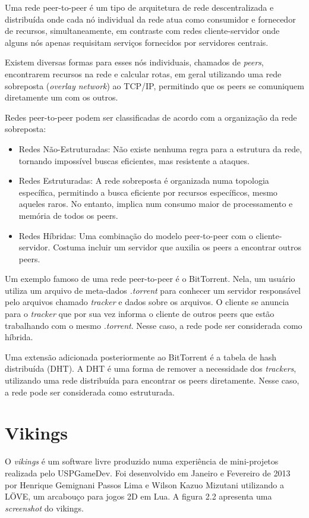   Uma rede peer-to-peer é um tipo de arquitetura de rede descentralizada e distribuída
  onde cada nó individual da rede atua como consumidor e fornecedor de recursos,
  simultaneamente, em contraste com redes cliente-servidor onde alguns nós apenas
  requisitam serviços fornecidos por servidores centrais. \cite{peertopeer:definition}
  
  Existem diversas formas para esses nós individuais, chamados de \textit{peers}, encontrarem
  recursos na rede e calcular rotas, em geral utilizando uma rede sobreposta (\textit{overlay
  network}) ao TCP/IP, permitindo que os peers se comuniquem diretamente um com os outros.
  
  Redes peer-to-peer podem ser classificadas de acordo com a organização da rede sobreposta:
  \begin{itemize}
    \item Redes Não-Estruturadas: Não existe nenhuma regra para a estrutura da rede, tornando impossível
        buscas eficientes, mas resistente a ataques.
    \item Redes Estruturadas: A rede sobreposta é organizada numa topologia específica, permitindo a busca
        eficiente por recursos específicos, mesmo aqueles raros. No entanto, implica num consumo maior de
        processamento e memória de todos os peers.
    \item Redes Híbridas: Uma combinação do modelo peer-to-peer com o cliente-servidor. Costuma incluir um
        servidor que auxilia os peers a encontrar outros peers.
  \end{itemize}
  
  Um exemplo famoso de uma rede peer-to-peer é o BitTorrent. Nela, um usuário utiliza um
  arquivo de meta-dados \textit{.torrent} para conhecer um servidor responsável pelo arquivos
  chamado \textit{tracker} e dados sobre os arquivos. O cliente se anuncia para o \textit{tracker} que
  por sua vez informa o cliente de outros peers que estão trabalhando com o mesmo \textit{.torrent}.
  Nesse caso, a rede pode ser considerada como híbrida.
  
  Uma extensão adicionada posteriormente ao BitTorrent é a tabela de hash distribuída (DHT).
  A DHT é uma forma de remover a necessidade dos \textit{trackers}, utilizando uma rede distribuída
  para encontrar os peers diretamente. Nesse caso, a rede pode ser considerada como estruturada.

\section{Vikings}
\label{sec:conceitos:vikings}
  O \textit{vikings}\footnotemark{} é um software livre produzido numa experiência de mini-projetos
  realizada pelo USPGameDev\footnotemark. Foi desenvolvido em Janeiro e Fevereiro de 2013 por
  Henrique Gemignani Passos Lima e Wilson Kazuo Mizutani utilizando a LÖVE, um arcabouço para jogos
  2D em Lua\footnotemark{}. A figura 2.2 apresenta uma \textit{screenshot} do vikings.
  
